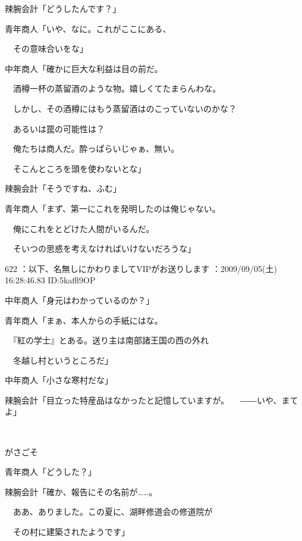 \documentclass[a4j,twocolumn]{tarticle}
\begin{document}
辣腕会計「どうしたんです？」 



青年商人「いや、なに。これがここにある、\par{} 
　その意味合いをな」 



中年商人「確かに巨大な利益は目の前だ。\par{} 
　酒樽一杯の蒸留酒のような物。嬉しくてたまらんわな。\par{} 
　しかし、その酒樽にはもう蒸留酒はのこっていないのかな？\par{} 
　あるいは罠の可能性は？ \par{}
　俺たちは商人だ。酔っぱらいじゃぁ、無い。\par{} 
　そこんところを頭を使わないとな」 



辣腕会計「そうですね、ふむ」 



青年商人「まず、第一にこれを発明したのは俺じゃない。\par{} 
　俺にこれをとどけた人間がいるんだ。\par{} 
　そいつの思惑を考えなければいけないだろうな」 

	
    
    

622 ：以下、名無しにかわりましてVIPがお送りします ：2009/09/05(土) 16:28:46.83 ID:5kaffl9OP 


中年商人「身元はわかっているのか？」 



青年商人「まぁ、本人からの手紙にはな。\par{} 
　『紅の学士』とある。送り主は南部諸王国の西の外れ\par{} 
　冬越し村というところだ」 



中年商人「小さな寒村だな」\par{} 
辣腕会計「目立った特産品はなかったと記憶していますが。 
　――いや、まてよ」 

　

がさごそ 



青年商人「どうした？」\par{} 
辣腕会計「確か、報告にその名前が……。\par{} 
　ああ、ありました。この夏に、湖畔修道会の修道院が \par{}
　その村に建築されたようです」 
\end{document}
